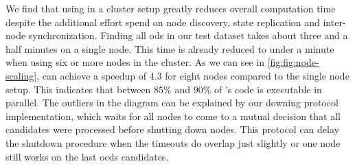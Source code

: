   We find that using \dodo{} in a cluster setup greatly reduces overall computation time despite the additional effort spend on node discovery, state replication and inter-node synchronization.
  Finding all \glspl{od} in our test dataset takes about three and a half minutes on a single node.
  This time is already reduced to under a minute when using six or more nodes in the \dodo{} cluster.
  As we can see in \cref{fig:fig:node-scaling}, \dodo{} can achieve a speedup of 4.3 for eight nodes compared to the single node setup.
  This indicates that between $85 \%$ and $90 \%$ of \dodo{}'s code is executable in parallel.
  The outliers in the diagram can be explained by our downing protocol implementation, which waits for all nodes to come to a mutual decision that all candidates were processed before shutting down nodes.
  This protocol can delay the shutdown procedure when the timeouts do overlap just slightly or one node still works on the last \glspl{ocd} candidates.
